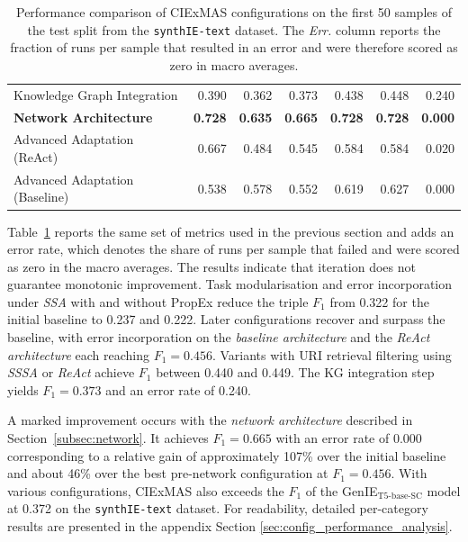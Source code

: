 \documentclass[a4paper,oneside,bibliography=totoc]{scrbook}
\begin{document}
\begin{table}[h]
\begin{tabular}{p{5cm}|rrrrrr}
    Knowledge Graph Integration                  & 0.390                                         & 0.362          & 0.373          & 0.438          & 0.448          & 0.240          \\
    \textbf{Network Architecture}                & \textbf{0.728}                                & \textbf{0.635} & \textbf{0.665} & \textbf{0.728} & \textbf{0.728} & \textbf{0.000} \\
    Advanced Adaptation (\ac{ReAct})             & 0.667                                         & 0.484          & 0.545          & 0.584          & 0.584          & 0.020          \\
    Advanced Adaptation (Baseline)               & 0.538                                         & 0.578          & 0.552          & 0.619          & 0.627          & 0.000          \\
    \bottomrule
  \end{tabular}
  \caption{Performance comparison of CIExMAS configurations on the first 50 samples of the test split from the \texttt{synthIE\allowbreak-text} dataset. The \emph{Err.} column reports the fraction of runs per sample that resulted in an error and were therefore scored as zero in macro averages.}
  \label{tab:evaluation_iterations}
\end{table}

Table~\ref{tab:evaluation_iterations} reports the same set of metrics used in the previous section and adds an error rate, which denotes the share of runs per sample that failed and were scored as zero in the macro averages. The results indicate that iteration does not guarantee monotonic improvement. Task modularisation and error incorporation under \textit{\ac{SSA}} with and without \ac{PropEx} reduce the triple $F_1$ from 0.322 for the initial baseline to 0.237 and 0.222. Later configurations recover and surpass the baseline, with error incorporation on the \textit{baseline architecture} and the \textit{\ac{ReAct} architecture} each reaching $F_1=0.456$. Variants with \ac{URI} retrieval filtering using \textit{\ac{SSSA}} or \textit{\ac{ReAct}} achieve $F_1$ between 0.440 and 0.449. The \ac{KG} integration step yields $F_1=0.373$ and an error rate of 0.240.

A marked improvement occurs with the \textit{network architecture} described in Section~\ref{subsec:network}. It achieves $F_1=0.665$ with an error rate of 0.000 corresponding to a relative gain of approximately 107\% over the initial baseline and about 46\% over the best pre-network configuration at $F_1=0.456$. With various configurations, CIExMAS also exceeds the $F_1$ of the GenIE$_{\text{T5-base-SC}}$ model at 0.372 on the \texttt{synthIE-text} dataset. For readability, detailed per-category results are presented in the appendix Section \ref{sec:config_performance_analysis}.
\end{document}

